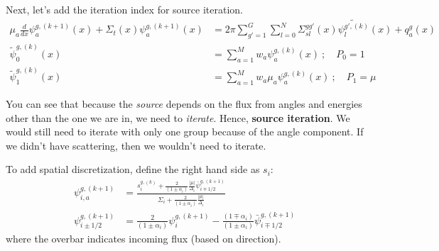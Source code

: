 \documentclass[12pt]{article}
\newcommand{\Di}{\ensuremath{\Delta_i}}
\begin{document}
Next, let's add the iteration index for source iteration.  
\begin{align}
\mu_a \frac{d}{dx}\psi_{a}^{g, (k+1)}(x) + \Sigma_{t}(x) \psi_{a}^{g, (k+1)}(x) &= 2\pi \sum_{g'=1}^G
  \sum_{l=0}^N \Sigma_{sl}^{gg'}(x) \tilde{\psi^{g', (k)}_l}(x) + q_{a}^g(x)\\
\tilde{\psi}^{g, (k)}_0(x) &= \sum_{a=1}^M w_a \psi_a^{g, (k)}(x)\:; \quad P_0 = 1\\
\tilde{\psi}^{g, (k)}_1(x) &= \sum_{a=1}^M w_a \mu_a \psi_a^{g, (k)}(x)\:; \quad P_1 = \mu
\end{align}

You can see that because the \textit{source} depends on the flux from angles and energies other than the one we are in, we need to \textit{iterate}. Hence, \textbf{source iteration}. We would still need to iterate with only one group because of the angle component. If we didn't have scattering, then we wouldn't need to iterate. 

To add spatial discretization, define the right hand side as $s_i$:
\begin{align}
\psi_{i,a}^{g,(k+1)} &= \frac{s_{i}^{g,(k)} + \frac{2}{(1\pm\alpha_i)}\frac{|\mu|}{\Di}\bar{\psi}^{g,(k+1)}_{i\mp1/2}}{
      \Sigma_{i} + \frac{2}{(1\pm\alpha_i)}\frac{|\mu|}{\Di}} \label{eq:dd}\\
%
%
\psi_{i\pm1/2}^{g,(k+1)} &= \frac{2}{(1\pm\alpha_i)}\psi_{i}^{g,(k+1)}-
    \frac{(1\mp\alpha_i)}{(1\pm\alpha_i)}\bar{\psi}_{i\mp1/2}^{g,(k+1)} \label{eq:out}
\end{align}
where the overbar indicates incoming flux (based on direction).
\end{document}
